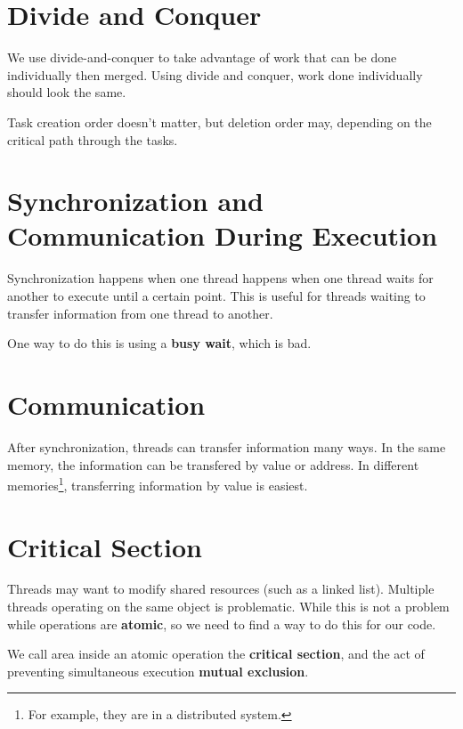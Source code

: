         \section{Divide and Conquer} %
        \label{sec:divide_and_conquer}
            We use divide-and-conquer to take advantage of work that can be done individually then merged.
            Using divide and conquer, work done individually should look the same.

            Task creation order doesn't matter, but deletion order may, depending on the critical path through the tasks.
        \section{Synchronization and Communication During Execution} %
        \label{sec:synchronization_and_communication_during_execution}
            Synchronization happens when one thread happens when one thread waits for another to execute until a certain point.
            This is useful for threads waiting to transfer information from one thread to another.

            One way to do this is using a \textbf{busy wait}, which is bad.
        \section{Communication} %
        \label{sec:communication}
            After synchronization, threads can transfer information many ways.
            In the same memory, the information can be transfered by value or address.
            In different memories\footnote{For example, they are in a distributed system.}, transferring information by value is easiest.
        \section{Critical Section} %
        \label{sec:critical_section}
            Threads may want to modify shared resources (such as a linked list).
            Multiple threads operating on the same object is problematic.
            While this is not a problem while operations are \textbf{atomic}, so we need to find a way to do this for our code.

            We call area inside an atomic operation the \textbf{critical section}, and the act of preventing simultaneous execution \textbf{mutual exclusion}.

